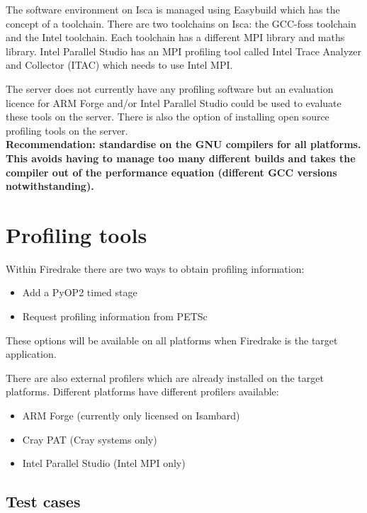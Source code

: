 \documentclass[a4paper,titlepage]{article}
\begin{document}
The software environment on Isca is managed using Easybuild which has the concept of a toolchain. There are two toolchains on Isca: the GCC-foss toolchain and the Intel toolchain. Each toolchain has a different MPI library and maths library. Intel Parallel Studio has an MPI profiling tool called Intel Trace Analyzer and Collector (ITAC) which needs to use Intel MPI.

The server does not currently have any profiling software but an evaluation licence for ARM Forge and/or Intel Parallel Studio could be used to evaluate these tools on the server. There is also the option of installing open source profiling tools on the server. \\

\noindent
\textbf{Recommendation: standardise on the GNU compilers for all platforms. This avoids having to manage too many different builds and takes the compiler out of the performance equation (different GCC versions notwithstanding).}


\section{Profiling tools}

Within Firedrake there are two ways to obtain profiling information:
\begin{itemize}
\item Add a PyOP2 timed stage
\item Request profiling information from PETSc
\end{itemize}
These options will be available on all platforms when Firedrake is the target application.

There are also external profilers which are already installed on the target platforms. Different platforms have different profilers available:
\begin{itemize}
\item ARM Forge (currently only licensed on Isambard)
\item Cray PAT (Cray systems only)
\item Intel Parallel Studio (Intel MPI only)
\end{itemize}

\subsection{Test cases}
\end{document}
